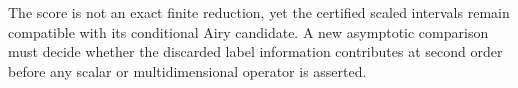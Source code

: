 The score is not an exact finite reduction, yet the certified scaled intervals remain compatible with its conditional Airy candidate.  A new asymptotic comparison must decide whether the discarded label information contributes at second order before any scalar or multidimensional operator is asserted.